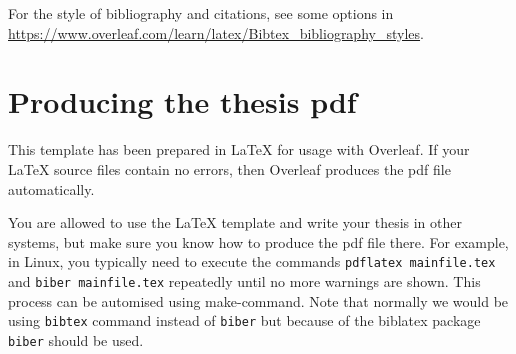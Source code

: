 For the style of bibliography and citations, see some options in \url{https://www.overleaf.com/learn/latex/Bibtex_bibliography_styles}.


\section{Producing the thesis pdf}

This template has been prepared in LaTeX for usage with Overleaf. If your LaTeX source files contain no errors, then Overleaf produces the pdf file automatically.

You are allowed to use the LaTeX template and write your thesis in other systems, but make sure you know how to produce the pdf file there. 
For example, in Linux, you typically need to execute the commands \texttt{pdflatex mainfile.tex} and \texttt{biber mainfile.tex} repeatedly until no more warnings are shown. This process can be automised using make-command. 
Note that normally we would be using \texttt{bibtex} command instead of \texttt{biber} but because of the biblatex package \texttt{biber} should be used.
